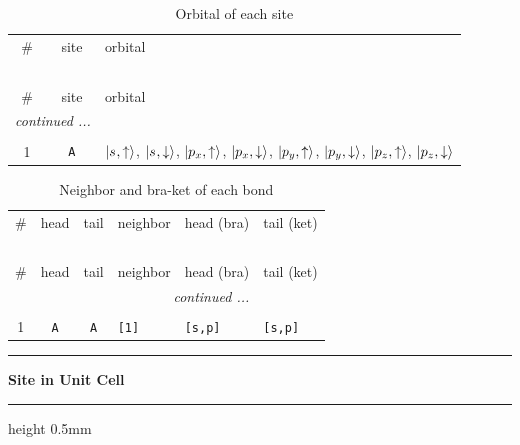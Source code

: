\documentclass[fleqn,10pt,landscape]{jsarticle}
\begin{document}
\renewcommand{\arraystretch}{1.6}
\begin{longtable}[l]{ccl}
\captionsetup{justification=raggedright, singlelinecheck=off}
\caption{Orbital of each site}
 \\
 \hline \hline
\# & site & orbital \\ \hline \endfirsthead

\multicolumn{2}{l}{\tablename\ \thetable{}} \\
 \hline \hline
\# & site & orbital \\ \hline \endhead

 \hline \hline
\multicolumn{2}{r}{\footnotesize\it continued ...} \\ \endfoot

 \hline \hline
\multicolumn{2}{r}{} \\ \endlastfoot

1 & \texttt{A} & $\ket{s_{},\uparrow}$, $\ket{s_{},\downarrow}$, $\ket{p_{x},\uparrow}$, $\ket{p_{x},\downarrow}$, $\ket{p_{y},\uparrow}$, $\ket{p_{y},\downarrow}$, $\ket{p_{z},\uparrow}$, $\ket{p_{z},\downarrow}$ \\
\end{longtable}
\renewcommand{\arraystretch}{1.6}
\begin{longtable}[l]{ccclll}
\captionsetup{justification=raggedright, singlelinecheck=off}
\caption{Neighbor and bra-ket of each bond}
 \\
 \hline \hline
\# & head & tail & neighbor & head (bra) & tail (ket) \\ \hline \endfirsthead

\multicolumn{5}{l}{\tablename\ \thetable{}} \\
 \hline \hline
\# & head & tail & neighbor & head (bra) & tail (ket) \\ \hline \endhead

 \hline \hline
\multicolumn{5}{r}{\footnotesize\it continued ...} \\ \endfoot

 \hline \hline
\multicolumn{5}{r}{} \\ \endlastfoot

1 & \texttt{A} & \texttt{A} & \texttt{[1]} & \texttt{[s,p]} & \texttt{[s,p]} \\
\end{longtable}
\vspace{5mm}
\noindent \rule[0.5mm]{5mm}{0.5mm}\hspace{3mm}\textbf{Site in Unit Cell}\hspace{3mm}\leaders\hrule height 0.5mm\hfill\kern0pt
\vspace{3mm}
\end{document}
